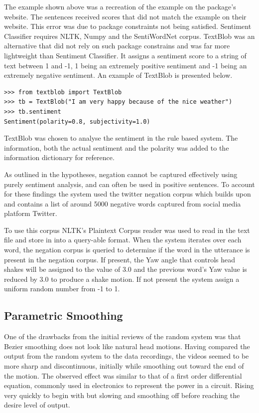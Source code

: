 \documentclass[bsc,frontabs,twoside,singlespacing,parskip,deptreport]{infthesis}
\begin{document}
The example shown above was a recreation of the example on the package's website. The sentences received scores that did not match the example on their website. This error was due to package constraints not being satisfied. Sentiment Classifier requires NLTK, Numpy and the SentiWordNet corpus. TextBlob \cite{text_blob} was an alternative that did not rely on such package constrains and was far more lightweight than Sentiment Classifier. It assigns a sentiment score to a string of text between 1 and -1, 1 being an extremely positive sentiment and -1 being an extremely negative sentiment. An example of TextBlob is presented below.

\begin{lstlisting}
>>> from textblob import TextBlob
>>> tb = TextBlob("I am very happy because of the nice weather")
>>> tb.sentiment
Sentiment(polarity=0.8, subjectivity=1.0)
\end{lstlisting}

TextBlob was chosen to analyse the sentiment in the rule based system. The information, both the actual sentiment and the polarity was added to the information dictionary for reference.

As outlined in the hypotheses, negation cannot be captured effectively using purely sentiment analysis, and can often be used in positive sentences. To account for these findings the system used the twitter negation corpus \cite{neg_corpus} which builds upon \cite{negation_corpus_1}\cite{negation_corpus_2} and contains a list of around 5000 negative words captured from social media platform Twitter.

To use this corpus NLTK's Plaintext Corpus reader was used to read in the text file and store in into a query-able format. When the system iterates over each word, the negation corpus is queried to determine if the word in the utterance is present in the negation corpus. If present, the Yaw angle that controls head shakes will be assigned to the value of 3.0 and the previous word's Yaw value is reduced by 3.0 to produce a shake motion. If not present the system assign a uniform random number from -1 to 1.

\subsection{Parametric Smoothing}

One of the drawbacks from the initial reviews of the random system was that Bezier smoothing does not look like natural head motions. Having compared the output from the random system to the data recordings, the videos seemed to be more sharp and discontinuous, initially while smoothing out toward the end of the motion. The observed effect was similar to that of a first order differential equation, commonly used in electronics to represent the power in a circuit. Rising very quickly to begin with but slowing and smoothing off before reaching the desire level of output. 
\end{document}
